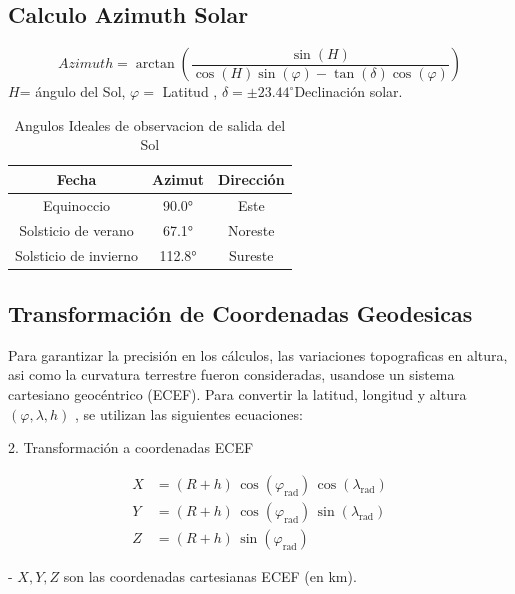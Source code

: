 \documentclass[a4paper,alpha-refs]{eSpectra}
\begin{document}
\subsection{Calculo Azimuth Solar}


\[Azimuth=\arctan \left(
\frac{\sin(H)}{\cos(H)\sin(\varphi) - \tan(\delta)\cos(\varphi)}
\right)\]
\noindent \(H\)= ángulo del Sol, \(\varphi =\) Latitud , \(\delta = \pm 23.44^\circ\)Declinación solar.

\begin{table}[h!]
\centering
\begin{tabular}{|c|c|c|}
\hline
\textbf{Fecha} & \textbf{Azimut}  & \textbf{Dirección} \\ \hline
Equinoccio & 90.0° & Este \\ \hline
Solsticio de verano & 67.1° & Noreste \\ \hline
Solsticio de invierno & 112.8° & Sureste \\ \hline
\end{tabular}
\smallskip
\caption{Angulos Ideales de observacion de salida del Sol}
\label{Cuadro 1}
\end{table}

\vspace{-\baselineskip}  %
\vspace{-1\baselineskip}  %

\subsection{Transformación de Coordenadas Geodesicas}
Para garantizar la precisión en los cálculos, las variaciones topograficas en altura, asi como la curvatura terrestre fueron consideradas, usandose un sistema cartesiano geocéntrico (ECEF). Para convertir la latitud, longitud y altura   \((\varphi, \lambda, h)\) , se utilizan las siguientes ecuaciones:

2. Transformación a coordenadas ECEF

\[
\begin{aligned}
X &= (R + h) \, \cos(\varphi_{\text{rad}}) \, \cos(\lambda_{\text{rad}}) \\
Y &= (R + h) \, \cos(\varphi_{\text{rad}}) \, \sin(\lambda_{\text{rad}}) \\
Z &= (R + h) \, \sin(\varphi_{\text{rad}})
\end{aligned}
\]

- \(X, Y, Z\) son las coordenadas cartesianas ECEF (en km).
\end{document}
